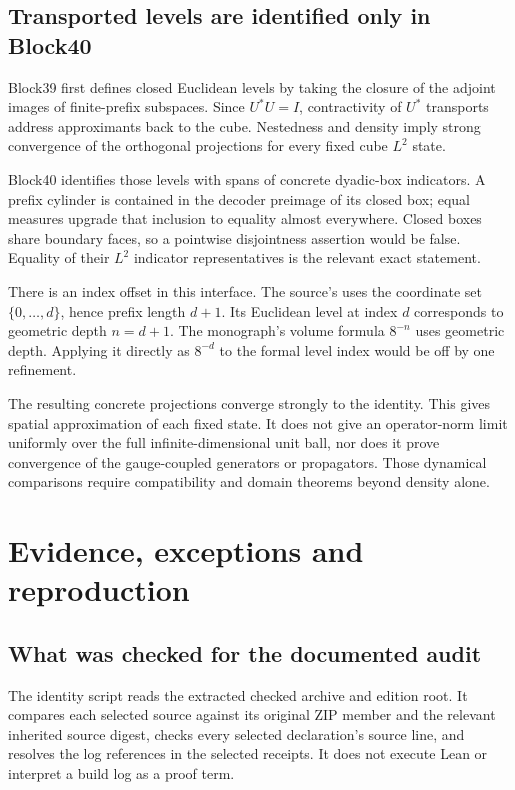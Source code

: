 \subsection{Transported levels are identified only in Block40}

Block39 first defines closed Euclidean levels by taking the closure of the adjoint images of finite-prefix subspaces. Since \(U^*U=I\), contractivity of \(U^*\) transports address approximants back to the cube. Nestedness and density imply strong convergence of the orthogonal projections for every fixed cube \(L^2\) state.

Block40 identifies those levels with spans of concrete dyadic-box indicators. A prefix cylinder is contained in the decoder preimage of its closed box; equal measures upgrade that inclusion to equality almost everywhere. Closed boxes share boundary faces, so a pointwise disjointness assertion would be false. Equality of their \(L^2\) indicator representatives is the relevant exact statement.

There is an index offset in this interface. The source's  uses the coordinate set \(\{0,\ldots,d\}\), hence prefix length \(d+1\). Its Euclidean level at index \(d\) corresponds to geometric depth \(n=d+1\). The monograph's volume formula \(8^{-n}\) uses geometric depth. Applying it directly as \(8^{-d}\) to the formal level index would be off by one refinement.

The resulting concrete projections converge strongly to the identity. This gives spatial approximation of each fixed state. It does not give an operator-norm limit uniformly over the full infinite-dimensional unit ball, nor does it prove convergence of the gauge-coupled generators or propagators. Those dynamical comparisons require compatibility and domain theorems beyond density alone.

\section{Evidence, exceptions and reproduction}\label{sec:gauge-evidence}

\subsection{What was checked for the documented audit}

The identity script  reads the extracted checked archive and edition root. It compares each selected source against its original ZIP member and the relevant inherited source digest, checks every selected declaration's source line, and resolves the log references in the selected receipts. It does not execute Lean or interpret a build log as a proof term.

